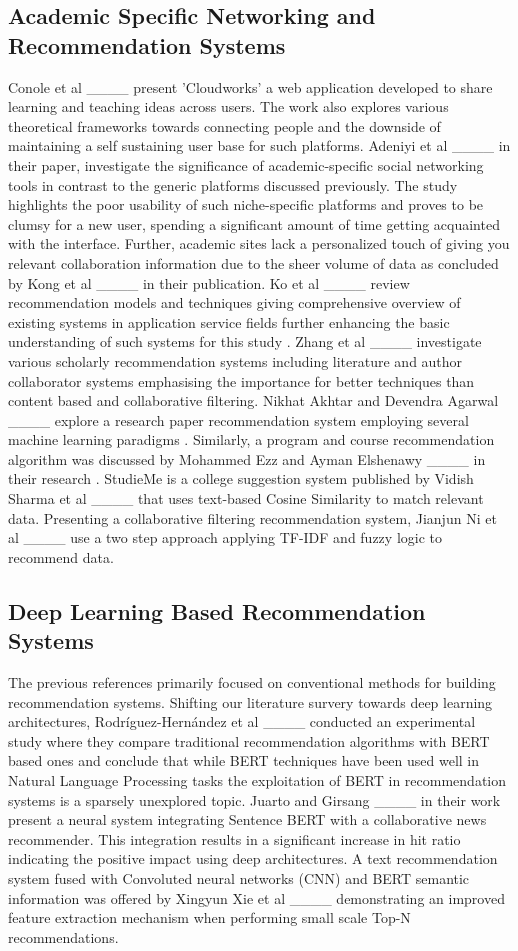 \subsection{Academic Specific Networking and Recommendation Systems} Conole et al ____ present 'Cloudworks' a web application developed to share learning and teaching ideas across users. The work also explores various theoretical frameworks towards connecting people and the downside of maintaining a self sustaining user base for such platforms. 
Adeniyi et al ____ in their paper, investigate the significance of academic-specific social networking tools in contrast to the generic platforms discussed previously. The study highlights the poor usability of such niche-specific platforms and proves to be clumsy for a new user, spending a significant amount of time getting acquainted with the interface. Further, academic sites lack a personalized touch of giving you relevant collaboration information due to the sheer volume of data as concluded by Kong et al ____ in their publication. Ko et al ____ review recommendation models and techniques giving comprehensive overview of existing systems in application service fields further enhancing the basic understanding of such systems for this study . Zhang et al ____ investigate various scholarly recommendation systems including literature and author collaborator systems emphasising the importance for better techniques than content based and collaborative filtering. Nikhat Akhtar and Devendra Agarwal ____ explore a research paper recommendation system employing several machine learning paradigms . Similarly, a program and course recommendation algorithm was discussed by Mohammed Ezz and Ayman Elshenawy ____ in their research . StudieMe is a college suggestion system published by Vidish Sharma et al ____ that uses text-based Cosine Similarity to match relevant data. Presenting a collaborative filtering recommendation system, Jianjun Ni et al ____ use a two step approach applying TF-IDF and fuzzy logic to recommend data. 

\subsection{Deep Learning Based Recommendation Systems} The previous references primarily focused on conventional methods for building recommendation systems. Shifting our literature survery towards deep learning architectures, Rodríguez-Hernández et al ____ conducted an experimental study where they compare traditional recommendation algorithms with BERT based ones and conclude that while BERT techniques have been used well in Natural Language Processing tasks the exploitation of BERT in recommendation systems is a sparsely unexplored topic. Juarto and Girsang ____ in their work present a neural system integrating Sentence BERT with a collaborative news recommender. This integration results in a significant increase in hit ratio indicating the positive impact using deep architectures. A text recommendation system fused with Convoluted neural networks (CNN) and BERT semantic information was offered by Xingyun Xie et al ____ demonstrating an improved feature extraction mechanism when performing small scale Top-N recommendations.